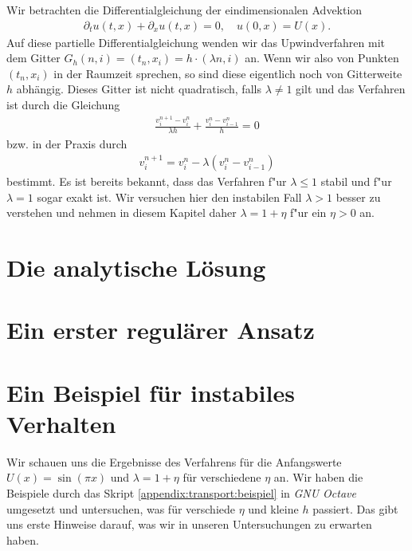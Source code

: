 Wir betrachten die Differentialgleichung der eindimensionalen Advektion
\begin{align}\label{eq:adv:pde}
\partial_t u(t, x) + \partial_x u(t, x) = 0, \quad u(0, x) = U(x).
\end{align}
Auf diese partielle Differentialgleichung wenden wir das Upwindverfahren mit dem Gitter $G_h(n,i) = (t_n, x_i) = h \cdot (\lambda n, i)$ an.
Wenn wir also von Punkten $(t_n, x_i)$ in der Raumzeit sprechen, so sind diese eigentlich noch von Gitterweite $h$ abhängig. 
Dieses Gitter ist nicht quadratisch, falls $\lambda \neq 1$ gilt und das Verfahren ist durch die Gleichung
\begin{align}\label{eq:adv:scheme_rechnung}
\frac {v^{n+1}_i - v^n_i} {\lambda h} + \frac {v^n_i - v^n_{i-1}} h = 0
\end{align}
bzw. in der Praxis durch
\begin{align}\label{eq:adv:scheme}
v^{n+1}_i = v^n_i - \lambda (v^n_i - v^n_{i-1})
\end{align}
bestimmt.
Es ist bereits bekannt, dass das Verfahren f"ur $\lambda \leq 1$ stabil und f"ur $\lambda = 1$ sogar exakt ist.
Wir versuchen hier den instabilen Fall $\lambda > 1$ besser zu verstehen und nehmen in diesem Kapitel daher $\lambda = 1 + \eta$ f"ur ein $\eta > 0$ an.

\section{Die analytische Lösung}

\section{Ein erster regulärer Ansatz}

\section{Ein Beispiel für instabiles Verhalten}\label{sec:transport:beispiel}

Wir schauen uns die Ergebnisse des Verfahrens für die Anfangswerte $U(x) = \sin(\pi x)$ und $\lambda = 1 + \eta$ für verschiedene $\eta$ an.
Wir haben die Beispiele durch das Skript \ref{appendix:transport:beispiel} in \emph{GNU Octave} umgesetzt und untersuchen, was für verschiede $\eta$ und kleine $h$ passiert.
Das gibt uns erste Hinweise darauf, was wir in unseren Untersuchungen zu erwarten haben.

